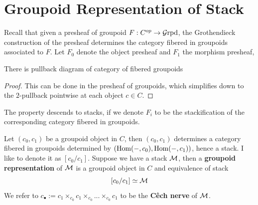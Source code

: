 \section{Groupoid Representation of Stack}\label{sec:algebraicgeometry-groupoid}

   Recall that given a presheaf of groupoid $F:C^{op}\to \operatorname{\mathcal{G}rpd}$, the Grothendieck construction of the presheaf determines the category fibered in groupoids associated to $F$.
   Let $F_0$ denote the object presheaf and $F_1$ the morphism presheaf,
   \begin{proposition}
    There is pullback diagram of category of fibered groupoids
    \begin{center}
    \end{center}
   \end{proposition}
   \begin{proof}
        This can be done in the presheaf of groupoids, which simplifies down to the $2$-pullback pointwise at each object $c\in C$.
   \end{proof}
   \begin{corollary}
    The property descends to stacks, if we denote $F_i$ to be the stackification of the corresponding category fibered in groupoids.
   \end{corollary}

   Let $(c_0, c_1)$ be a groupoid object in $C$, then $(c_0,c_1)$ determines a category fibered in groupoids determined by $(\operatorname{Hom}(-,c_0), \operatorname{Hom}(-,c_1))$, hence a stack. I like to denote it as $[c_0/c_1]$. Suppose we have a stack $\mathcal{M}$, then a \textbf{groupoid representation} of $\mathcal{M}$ is a groupoid object in $C$ and equivalence of stack
   \[
   [c_0/c_1]\simeq \mathcal{M}
   \]
   We refer to $c_\bullet:=c_1\times_{c_0}c_1\times_{c_0}...\times_{c_0}c_1$ to be the \textbf{Cêch nerve} of $\mathcal{M}$.

